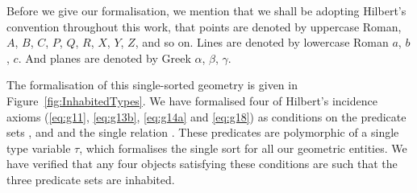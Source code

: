 Before we give our formalisation, we mention that we shall be adopting Hilbert's convention throughout this work, that points are denoted by uppercase Roman, $A$, $B$, $C$, $P$, $Q$, $R$, $X$, $Y$, $Z$, and so on. Lines are denoted by lowercase Roman $a$, $b$, $c$. And planes are denoted by Greek $\alpha$, $\beta$, $\gamma$.

The formalisation of this single-sorted geometry is given in Figure~\ref{fig:InhabitedTypes}. We have formalised four of Hilbert's incidence axioms (\ref{eq:g11}, \ref{eq:g13b}, \ref{eq:g14a} and \ref{eq:g18}) as conditions on the predicate sets ,  and  and the single relation . These predicates are polymorphic of a single type variable $\tau$, which formalises the single sort for all our geometric entities. We have verified that any four objects satisfying these conditions are such that the three predicate sets are inhabited.

